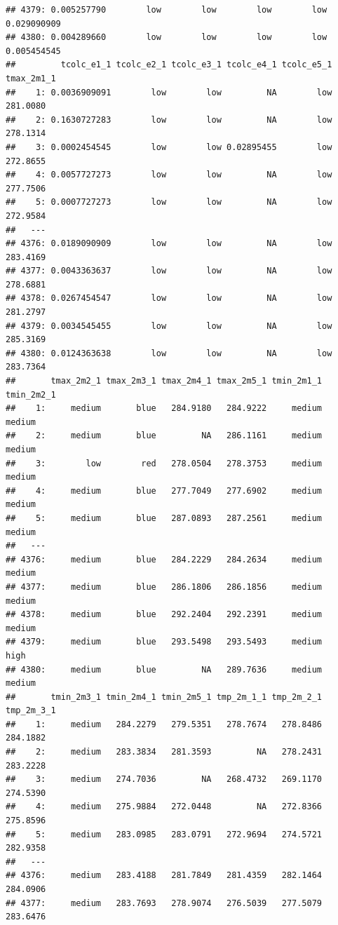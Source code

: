 \documentclass[
  11pt,
  a4paper,
]{article}
\begin{document}
\begin{verbatim}
## 4379: 0.005257790        low        low        low        low 0.029090909
## 4380: 0.004289660        low        low        low        low 0.005454545
##         tcolc_e1_1 tcolc_e2_1 tcolc_e3_1 tcolc_e4_1 tcolc_e5_1 tmax_2m1_1
##    1: 0.0036909091        low        low         NA        low   281.0080
##    2: 0.1630727283        low        low         NA        low   278.1314
##    3: 0.0002454545        low        low 0.02895455        low   272.8655
##    4: 0.0057727273        low        low         NA        low   277.7506
##    5: 0.0007727273        low        low         NA        low   272.9584
##   ---                                                                    
## 4376: 0.0189090909        low        low         NA        low   283.4169
## 4377: 0.0043363637        low        low         NA        low   278.6881
## 4378: 0.0267454547        low        low         NA        low   281.2797
## 4379: 0.0034545455        low        low         NA        low   285.3169
## 4380: 0.0124363638        low        low         NA        low   283.7364
##       tmax_2m2_1 tmax_2m3_1 tmax_2m4_1 tmax_2m5_1 tmin_2m1_1 tmin_2m2_1
##    1:     medium       blue   284.9180   284.9222     medium     medium
##    2:     medium       blue         NA   286.1161     medium     medium
##    3:        low        red   278.0504   278.3753     medium     medium
##    4:     medium       blue   277.7049   277.6902     medium     medium
##    5:     medium       blue   287.0893   287.2561     medium     medium
##   ---                                                                  
## 4376:     medium       blue   284.2229   284.2634     medium     medium
## 4377:     medium       blue   286.1806   286.1856     medium     medium
## 4378:     medium       blue   292.2404   292.2391     medium     medium
## 4379:     medium       blue   293.5498   293.5493     medium       high
## 4380:     medium       blue         NA   289.7636     medium     medium
##       tmin_2m3_1 tmin_2m4_1 tmin_2m5_1 tmp_2m_1_1 tmp_2m_2_1 tmp_2m_3_1
##    1:     medium   284.2279   279.5351   278.7674   278.8486   284.1882
##    2:     medium   283.3834   281.3593         NA   278.2431   283.2228
##    3:     medium   274.7036         NA   268.4732   269.1170   274.5390
##    4:     medium   275.9884   272.0448         NA   272.8366   275.8596
##    5:     medium   283.0985   283.0791   272.9694   274.5721   282.9358
##   ---                                                                  
## 4376:     medium   283.4188   281.7849   281.4359   282.1464   284.0906
## 4377:     medium   283.7693   278.9074   276.5039   277.5079   283.6476

\end{verbatim}
\end{document}
